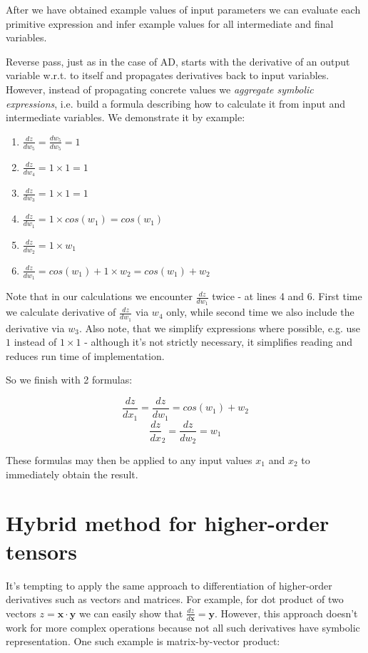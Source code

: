 \documentclass[conference]{IEEEtran}
\begin{document}
After we have obtained example values of input parameters we can
evaluate each primitive expression and infer example values for all
intermediate and final variables.

Reverse pass, just as in the case of AD, starts with the derivative of
an output variable w.r.t. to itself and propagates derivatives back to
input variables. However, instead of propagating concrete values we
\textit{aggregate symbolic expressions}, i.e. build a formula
describing how to calculate it from input and intermediate
variables. We demonstrate it by example:

\begin{enumerate}
\item $\frac{dz}{dw_5} = \frac{dw_5}{dw_5} = 1$
\item $\frac{dz}{dw_4} = 1 \times 1 = 1$
\item $\frac{dz}{dw_3} = 1 \times 1 = 1$
\item $\frac{dz}{dw_1} = 1 \times cos(w_1) = cos(w_1)$
\item $\frac{dz}{dw_2} = 1 \times w_1$
\item $\frac{dz}{dw_1} = cos(w_1) + 1 \times w_2 = cos(w_1) + w_2$
\end{enumerate}

Note that in our calculations we encounter $\frac{dz}{dw_1}$ twice -
at lines 4 and 6. First time we calculate derivative of
$\frac{dz}{dw_1}$ via $w_4$ only, while second time we also include
the derivative via $w_3$. Also note, that we simplify expressions
where possible, e.g. use $1$ instead of $1 \times 1$ - although it's
not strictly necessary, it simplifies reading and reduces run time of
implementation.

So we finish with 2 formulas:

$$\frac{dz}{dx_1} = \frac{dz}{dw_1} = cos(w_1) + w_2$$
$$\frac{dz}{dx}_2 = \frac{dz}{dw_2} = w_1$$

These formulas may then be applied to any input values $x_1$ and $x_2$
to immediately obtain the result.

\section{Hybrid method for higher-order tensors}

It's tempting to apply the same approach to differentiation of
higher-order derivatives such as vectors and matrices. For example,
for dot product of two vectors $z = \pmb{x} \cdot \pmb{y}$ we can
easily show that $\frac{dz}{d\pmb{x}} = \pmb{y}$. However, this
approach doesn't work for more complex operations because not all such
derivatives have symbolic representation. One such example is
matrix-by-vector product:
\end{document}
